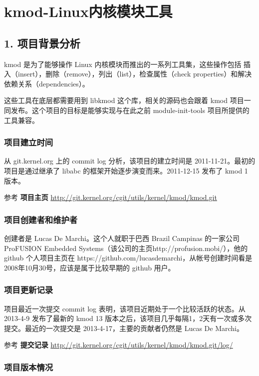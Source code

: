 \section{kmod-Linux内核模块工具}

\subsection{1. 项目背景分析}

kmod 是为了能够操作 Linux 内核模块而推出的一系列工具集，这些操作包括
插入（insert），删除（remove），列出（list），检查属性（check
properties）和解决依赖关系（dependencies）。

这些工具在底层都需要用到 libkmod 这个库，相关的源码也会跟着 kmod
项目一同发布。这个项目的目标是能够实现与在此之前 module-init-tools
项目所提供的工具兼容。

\subsubsection{项目建立时间}

从 git.kernel.org 上的 commit log 分析，该项目的建立时间是
2011-11-21。最初的项目是通过继承了 libabc
的框架开始逐步演变而来。2011-12-15 发布了 kmod 1 版本。

参考 \textbf{项目主页}
\url{http://git.kernel.org/cgit/utils/kernel/kmod/kmod.git}

\subsubsection{项目创建者和维护者}

创建者是 Lucas De Marchi。这个人就职于巴西 Brazil Campinas
的一家公司ProFUSION Embedded
Systems（该公司的主页http://profusion.mobi/），他的 github 个人项目主页在
https://github.com/lucasdemarchi，从帐号创建时间看是
2008年10月30号，应该是属于比较早期的 github 用户。

\subsubsection{项目更新记录}

项目最近一次提交 commit log 表明，该项目近期处于一个比较活跃的状态。从
2013-4-9 发布了最新的 kmod 13
版本之后，该项目几乎每隔1，2天有一次或多次提交。最近的一次提交是
2013-4-17，主要的贡献者仍然是 Lucas De Marchi。

参考 \textbf{提交记录}
\url{http://git.kernel.org/cgit/utils/kernel/kmod/kmod.git/log/}

\subsubsection{项目版本情况}

